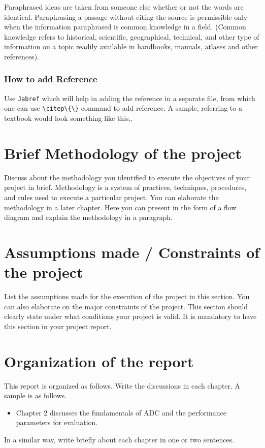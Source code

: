 Paraphrased ideas are taken from someone else whether or not the words are identical. Paraphrasing a passage without citing the source is permissible only when the information paraphrased is common knowledge in a field. (Common knowledge refers to historical, scientific, geographical, technical, and other type of information on a topic readily available in handbooks, manuals, atlases and other references). 

\subsubsection{How to add Reference}
Use \texttt{Jabref} which will help in adding the reference in a separate file, from which one can use \verb|\citep\{\}| command to add reference. A sample, referring to a textbook would look something like this,\cite{Razavi2000}.

\section[Brief Methodology of the project]{\textbf{Brief Methodology of the project}}
Discuss about the methodology you identified to execute the objectives of your project in brief. Methodology is a system of practices, techniques, procedures, and rules used to execute a particular project. You can elaborate the methodology in a later chapter. Here you can present in the form of a flow diagram and explain the methodology in a paragraph.

\section[Assumptions made / Constraints of the project]{\textbf{Assumptions made / Constraints of the project}}

List the assumptions made for the execution of the project in this section. You can also elaborate on the major constraints of the project. This section should clearly state under what conditions your project is valid. It is mandatory to have this section in your project report.

\section[Organization of the report]{\textbf{Organization of the report}}

This report is organized as follows. Write the discussions in each chapter. A sample is as follows.
\begin{itemize}
\item Chapter 2 discusses the fundamentals of ADC and the performance parameters for evaluation.
\end{itemize}

In a similar way, write briefly about each chapter in one or two sentences.